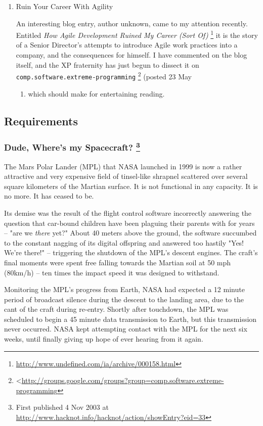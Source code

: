 \documentclass{article}
\begin{document}
\begin{enumerate}
\item Ruin Your Career With Agility
\label{sec:orgheadline221}

An interesting blog entry, author unknown, came to my attention
recently. Entitled \emph{How Agile Development Ruined My Career (Sort
Of)} \footnote{\url{http://www.undefined.com/ia/archive/000158.html}} it is the story of a Senior Director's attempts to introduce
Agile work practices into a company, and the consequences for himself. I
have commented on the blog itself, and the XP fraternity has just begun
to dissect it on \texttt{comp.software.extreme-programming} \footnote{<\url{http://groups.google.com/groups?group=comp.software.extreme-programming}} (posted 23 May
\begin{enumerate}
\item which should make for entertaining reading.
\end{enumerate}
\end{enumerate}

\subsection{Requirements}
\label{sec:orgheadline231}

\subsubsection{Dude, Where's my Spacecraft? \footnote{First published 4 Nov 2003 at
\url{http://www.hacknot.info/hacknot/action/showEntry?eid=33}}}
\label{sec:orgheadline227}

The Mars Polar Lander (MPL) that NASA launched in 1999 is now a rather
attractive and very expensive field of tinsel-like shrapnel scattered
over several square kilometers of the Martian surface. It is not
functional in any capacity. It is no more. It has ceased to be.

Its demise was the result of the flight control software incorrectly
answering the question that car-bound children have been plaguing their
parents with for years -- "are we \emph{there} yet?" About 40 meters above
the ground, the software succumbed to the constant nagging of its
digital offspring and answered too hastily "Yes! We're there!" --
triggering the shutdown of the MPL's descent engines. The craft's final
moments were spent free falling towards the Martian soil at 50 mph
(80km/h) -- ten times the impact speed it was designed to withstand.

Monitoring the MPL's progress from Earth, NASA had expected a 12 minute
period of broadcast silence during the descent to the landing area, due
to the cant of the craft during re-entry. Shortly after touchdown, the
MPL was scheduled to begin a 45 minute data transmission to Earth, but
this transmission never occurred. NASA kept attempting contact with the
MPL for the next six weeks, until finally giving up hope of ever hearing
from it again.
\end{document}
